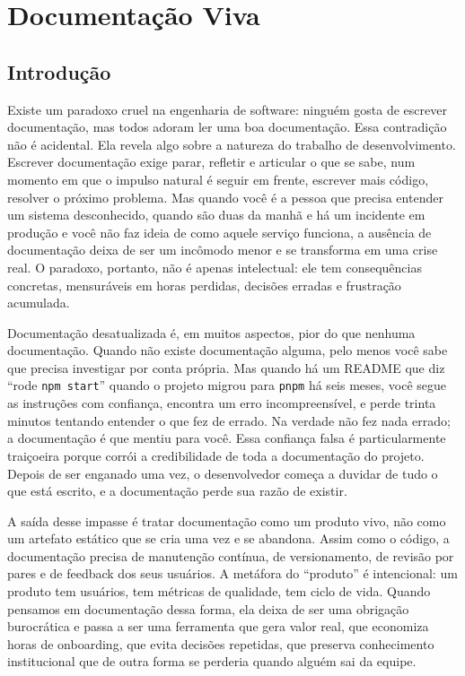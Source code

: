 \chapter{Documentação Viva}

\section{Introdução}

Existe um paradoxo cruel na engenharia de software: ninguém gosta de escrever
documentação, mas todos adoram ler uma boa documentação. Essa contradição não
é acidental. Ela revela algo sobre a natureza do trabalho de
desenvolvimento. Escrever documentação exige parar, refletir e articular
o que se sabe, num momento em que o impulso natural é seguir em frente,
escrever mais código, resolver o próximo problema. Mas quando você é a
pessoa que precisa entender um sistema desconhecido, quando são duas da
manhã e há um incidente em produção e você não faz ideia de como aquele
serviço funciona, a ausência de documentação deixa de ser um incômodo
menor e se transforma em uma crise real. O paradoxo, portanto, não é apenas
intelectual: ele tem consequências concretas, mensuráveis em horas
perdidas, decisões erradas e frustração acumulada.

Documentação desatualizada é, em muitos aspectos, pior do que nenhuma
documentação. Quando não existe documentação alguma, pelo menos você sabe
que precisa investigar por conta própria. Mas quando há um README
que diz ``rode \texttt{npm start}'' quando o projeto migrou para
\texttt{pnpm} há seis meses, você segue as instruções com confiança,
encontra um erro incompreensível, e perde trinta minutos tentando
entender o que fez de errado. Na verdade não fez nada errado;
a documentação é que mentiu para você. Essa confiança falsa é
particularmente traiçoeira porque corrói a credibilidade de toda a
documentação do projeto. Depois de ser enganado uma vez, o desenvolvedor
começa a duvidar de tudo o que está escrito, e a documentação perde sua
razão de existir.

A saída desse impasse é tratar documentação como um produto vivo, não
como um artefato estático que se cria uma vez e se abandona. Assim como
o código, a documentação precisa de manutenção contínua, de versionamento,
de revisão por pares e de feedback dos seus usuários. A metáfora do
``produto'' é intencional: um produto tem usuários, tem métricas de
qualidade, tem ciclo de vida. Quando pensamos em documentação dessa
forma, ela deixa de ser uma obrigação burocrática e passa a ser uma
ferramenta que gera valor real, que economiza horas de onboarding,
que evita decisões repetidas, que preserva conhecimento institucional
que de outra forma se perderia quando alguém sai da equipe.

